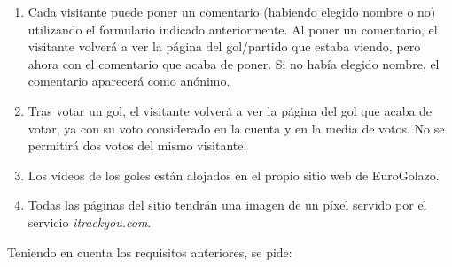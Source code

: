 \begin{enumerate}
  \item Cada visitante puede poner un comentario (habiendo elegido nombre o no) utilizando el formulario indicado anteriormente. Al poner un comentario, el visitante volverá a ver la página del gol/partido que estaba viendo, pero ahora con el comentario que acaba de poner. Si no había elegido nombre, el comentario aparecerá como anónimo.
  \item Tras votar un gol, el visitante volverá a ver la página del gol que acaba de votar, ya con su voto considerado en la cuenta y en la media de votos. No se permitirá dos votos del mismo visitante.
  \item Los vídeos de los goles están alojados en el propio sitio web de EuroGolazo.
  \item Todas las páginas del sitio tendrán una imagen de un píxel servido por el servicio \emph{itrackyou.com}.
\end{enumerate}

\newpage

Teniendo en cuenta los requisitos anteriores, se pide:

